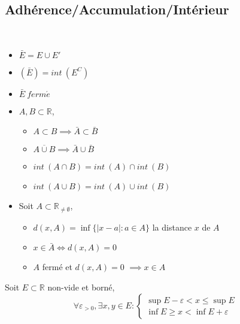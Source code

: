 	\subsection*{Adhérence/Accumulation/Intérieur}
	\begin{myprop}~
		\begin{itemize}
			\item $\bar{E}=E\cup E'$
			\item $(\bar{E})=int~(E^C)$
			\item $\bar{E}~ferm\acute{e}$
			\item $A,B\subset\mathbb{R}$,\begin{itemize}
				\item $A\subset B\implies \bar{A}\subset\bar{B}$
				\item $\overline{A\cup B}\implies\bar{A}\cup\bar{B}$
				\item $int~(A\cap B)=int~(A)\cap int~(B)$
				\item $int~(A\cup B)=int~(A)\cup int~(B)$ 
			\end{itemize}
			\item Soit $A\subset\mathbb{R}_{\neq\emptyset}$,\begin{itemize}
				\item $d(x,A)=\inf\{|x-a| : a\in A\}$ la distance $x$ de $A$
				\item $x\in \bar{A} \Longleftrightarrow d(x,A)=0$
				\item $A$ fermé et $d(x,A)=0$ $\implies x\in A$
			\end{itemize}
		\end{itemize}
	\end{myprop}
	\begin{myprop}
		Soit $E\subset\mathbb{R}$ non-vide et borné,
		\[\forall \varepsilon_{>0},\exists x,y\in E : \begin{cases}
		\sup E -\varepsilon <x\leq\sup E\\
		\inf E \geq x< \inf E+\varepsilon
		\end{cases}\]
	\end{myprop}